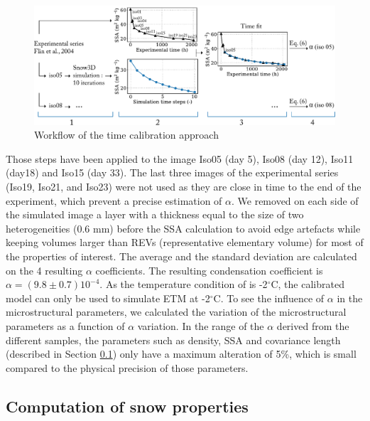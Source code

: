\documentclass[draft,ms]{agujournal2019}
\begin{document}
\hspace*{-0.2cm}
\begin{figure}
    \centering
    \includegraphics[width = \linewidth]{Figures/workflow_aff.pdf}
    \caption{Workflow of the time calibration approach}
    \label{fig:workflow}
\end{figure}
Those steps have been applied to the image Iso05 (day 5), Iso08 (day 12), Iso11 (day18) and Iso15 (day 33). The last three images of the experimental series (Iso19, Iso21, and Iso23) were not used as they are close in time to the end of the experiment, which prevent a precise estimation of $\alpha$. %
We removed on each side of the simulated image a layer with a thickness equal to the size of two heterogeneities (0.6 mm) before the SSA calculation to avoid edge artefacts while keeping volumes larger than REVs (representative elementary volume) for most of the properties of interest. The average and the standard deviation are calculated on the 4 resulting $\alpha$ coefficients. The resulting condensation coefficient is $\alpha = ( 9.8 \pm 0.7) 10^{-4}$. As the temperature condition of  is -2$^\circ$C, the calibrated model can only be used to simulate ETM at -2$^\circ$C. To see the influence of $\alpha$ in the microstructural parameters, we calculated the variation of the microstructural parameters as a function of $\alpha$ variation. In the range of the $\alpha$ derived from the different samples, the parameters such as density, SSA and covariance length (described in Section \ref{subsec:methode_physical_appli}) only have a maximum alteration of 5\%, which is small compared to the physical precision of those parameters. 

\subsection{Computation of snow properties}
\label{subsec:methode_physical_appli}
\end{document}

